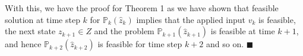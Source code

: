 With this, we have the proof for Theorem 1 as we have shown that feasible solution at time step $k$ for $\mathbb{P}_{k}(\hat{z}_{k}) $ implies that the applied input $v_k$ is feasible, the next state $z_{k+1} \in Z$ and the problem $\mathbb{P}_{k+1}(\hat{z}_{k+1}) $ is feasible at time $k+1$, and hence  $\mathbb{P}_{k+2}(\hat{z}_{k+2}) $ is feasible for time step $k+2$ and so on. $\blacksquare$






